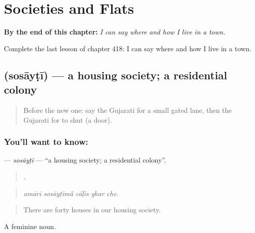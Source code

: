
\chapter{Societies and Flats}
\label{ch:gu-societies-and-flats}

\begin{chapteropening}
\textbf{By the end of this chapter:} \emph{I can say where and how I live in a town.}

Complete the last lesson of chapter 418: I can say where and how I live in a town.
\end{chapteropening}

\section[\texorpdfstring{\gu{સોસાયટી} (sosāyṭī)}{સોસાયટી (sosāyṭī)}]{ (sosāyṭī) — a housing society; a residential colony}

\label{lesson:GU-C418-sosayti}



\begin{quote}
Before the new one: say the Gujarati for a small gated lane, then the Gujarati for to shut (a door).
\end{quote}

\subsection*{You'll want to know: }
\textbf{} — \emph{sosāyṭī} — \textquotedblleft{}a housing society; a residential colony\textquotedblright{}.

\begin{quote}
    .
\end{quote}

\begin{quote}
\emph{amārī sosāyṭīmā̃ cāḷīs ghar che.}
\end{quote}

\begin{quote}
There are forty houses in our housing society.
\end{quote}

A feminine noun.

